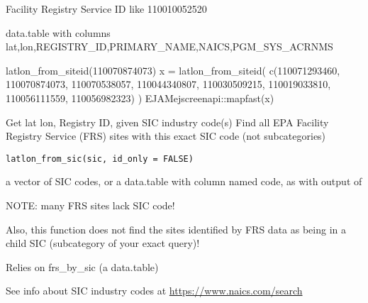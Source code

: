 \documentclass[a4paper]{book}
\begin{document}
%
\begin{Arguments}
\begin{ldescription}
\item[\code{siteid}] Facility Registry Service ID like 110010052520
\end{ldescription}
\end{Arguments}
%
\begin{Value}
data.table with columns
lat,lon,REGISTRY\_ID,PRIMARY\_NAME,NAICS,PGM\_SYS\_ACRNMS
\end{Value}
%
\begin{Examples}
\begin{ExampleCode}
 latlon_from_siteid(110070874073)
x = latlon_from_siteid(
    c(110071293460, 110070874073, 110070538057, 110044340807,
       110030509215, 110019033810, 110056111559, 110056982323)
        )
EJAMejscreenapi::mapfast(x)
\end{ExampleCode}
\end{Examples}
%
\begin{Description}\relax
Get lat lon, Registry ID, given SIC industry code(s)
Find all EPA Facility Registry Service (FRS) sites with this exact SIC code (not subcategories)
\end{Description}
%
\begin{Usage}
\begin{verbatim}
latlon_from_sic(sic, id_only = FALSE)
\end{verbatim}
\end{Usage}
%
\begin{Arguments}
\begin{ldescription}
\item[\code{sic}] a vector of SIC codes, or
a data.table with column named code, as with output of 
\end{ldescription}
\end{Arguments}
%
\begin{Details}\relax
NOTE: many FRS sites lack SIC code!

Also, this function does not find the sites
identified by FRS data as being in a child SIC (subcategory of your exact query)!

Relies on  frs\_by\_sic (a data.table)

See info about SIC industry codes at \url{https://www.naics.com/search}
\end{Details}
\end{document}

